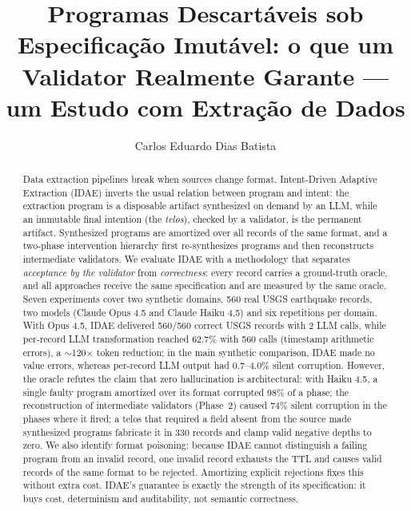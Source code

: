 \documentclass[sigconf,nonacm]{acmart}
\begin{document}
\title[Programas Descartáveis sob Especificação Imutável]{Programas Descartáveis sob Especificação Imutável: o que um Validator Realmente Garante --- um Estudo com Extração de Dados}

\author{Carlos Eduardo Dias Batista}

\renewcommand{\shortauthors}{Batista}

\begin{abstract}
Data extraction pipelines break when sources change format. Intent-Driven Adaptive Extraction (IDAE) inverts the usual relation between program and intent: the extraction program is a disposable artifact synthesized on demand by an LLM, while an immutable final intention (the \textit{telos}), checked by a validator, is the permanent artifact. Synthesized programs are amortized over all records of the same format, and a two-phase intervention hierarchy first re-synthesizes programs and then reconstructs intermediate validators. We evaluate IDAE with a methodology that separates \textit{acceptance by the validator} from \textit{correctness}: every record carries a ground-truth oracle, and all approaches receive the same specification and are measured by the same oracle. Seven experiments cover two synthetic domains, 560 real USGS earthquake records, two models (Claude Opus 4.5 and Claude Haiku 4.5) and six repetitions per domain. With Opus 4.5, IDAE delivered 560/560 correct USGS records with 2 LLM calls, while per-record LLM transformation reached 62.7\% with 560 calls (timestamp arithmetic errors), a $\sim$120$\times$ token reduction; in the main synthetic comparison, IDAE made no value errors, whereas per-record LLM output had 0.7--4.0\% silent corruption. However, the oracle refutes the claim that zero hallucination is architectural: with Haiku 4.5, a single faulty program amortized over its format corrupted 98\% of a phase; the reconstruction of intermediate validators (Phase~2) caused 74\% silent corruption in the phases where it fired; a telos that required a field absent from the source made synthesized programs fabricate it in 330 records and clamp valid negative depths to zero. We also identify format poisoning: because IDAE cannot distinguish a failing program from an invalid record, one invalid record exhausts the TTL and causes valid records of the same format to be rejected. Amortizing explicit rejections fixes this without extra cost. IDAE's guarantee is exactly the strength of its specification: it buys cost, determinism and auditability, not semantic correctness.
\end{abstract}
\end{document}
